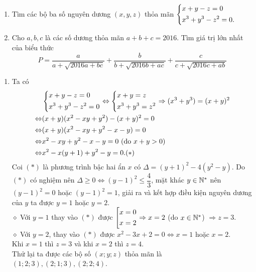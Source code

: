 \begin{ex}%
\hfill
    \begin{enumerate}
        \item Tìm các bộ ba số nguyên dương $(x,y,z)$ thỏa mãn $\left\{\begin{aligned}& x+y-z=0\\ & x^3+y^3-z^2=0.\end{aligned}\right.$
        \item Cho $a,b,c$ là các số dương thỏa mãn $a+b+c=2016$. Tìm giá trị lớn nhất của biểu thức 
        $$P=\dfrac{a}{a+\sqrt{2016a+bc}}+\dfrac{b}{b+\sqrt{2016b+ac}}+\dfrac{c}{c+\sqrt{2016c+ab}}$$
    \end{enumerate}
\loigiai
    {
    \begin{enumerate}
        \item Ta có 
        {\allowdisplaybreaks
        \begin{align*}
      		& \heva{& x+y-z=0 \\ & x^3+y^3-z^2=0} \Leftrightarrow \heva{& x+y =z \\ & x^3+y^3=z^2} \Rightarrow (x^3+y^3)=(x+y)^2\\
      		\Leftrightarrow & (x+y)(x^2-xy+y^2)-(x+y)^2=0\\
      		\Leftrightarrow & (x+y)(x^2-xy+y^2-x-y)=0 \\
      		\Leftrightarrow & x^2-xy+y^2-x-y=0\,\, (\text{do} \,\, x+y>0)\\
      		\Leftrightarrow & x^2-x(y+1)+y^2-y=0.  \hfill (*)
        \end{align*}}
        Coi $(*)$ là phương trình bậc hai ẩn $x$ có $\Delta = (y+1)^2-4(y^2-y)$. Do $(*)$ có nghiệm nên $\Delta \geq 0 \Leftrightarrow (y-1)^2 \le \dfrac{4}{3}$, mặt khác $y\in \Bbb N^*$ nên $(y-1)^2=0$ hoặc $(y-1)^2 =1$, giải ra và kết hợp điều kiện nguyên dương của $y$ ta được $y=1$ hoặc $y=2$.\\
        $\diamond$ Với $y=1$ thay vào $(*)$ được $\left[\begin{aligned}& x=0 \\ & x=2\end{aligned}\right. \Rightarrow x=2$ (do $x \in \Bbb N^*$) $\Rightarrow z =3$.\\
        $\diamond$ Với $y=2$, thay vào $(*)$ được $x^2-3x+2=0 \Leftrightarrow x=1$ hoặc $x=2$.\\
        Khi $x=1$ thì $z=3$ và khi $x=2$ thì $z=4$.\\
        Thử lại ta được các bộ số $(x;y;z)$ thỏa mãn là $(1;2;3), (2;1;3), (2;2;4)$.
        

\end{enumerate}}
\end{ex}
